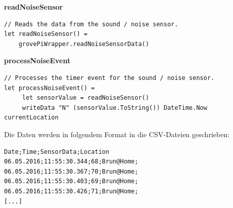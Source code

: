 \textbf{readNoiseSensor}
\begin{lstlisting}
// Reads the data from the sound / noise sensor. 
let readNoiseSensor() = 
	grovePiWrapper.readNoiseSensorData()
\end{lstlisting}  
   
   
\textbf{processNoiseEvent}
\begin{lstlisting}
// Processes the timer event for the sound / noise sensor.
let processNoiseEvent() =
     let sensorValue = readNoiseSensor()
     writeData "N" (sensorValue.ToString()) DateTime.Now currentLocation
\end{lstlisting}

Die Daten werden in folgendem Format in die CSV-Dateien geschrieben:
\begin{lstlisting}
Date;Time;SensorData;Location
06.05.2016;11:55:30.344;68;Brun@Home;
06.05.2016;11:55:30.367;70;Brun@Home;
06.05.2016;11:55:30.403;69;Brun@Home;
06.05.2016;11:55:30.426;71;Brun@Home;
[...]
\end{lstlisting}